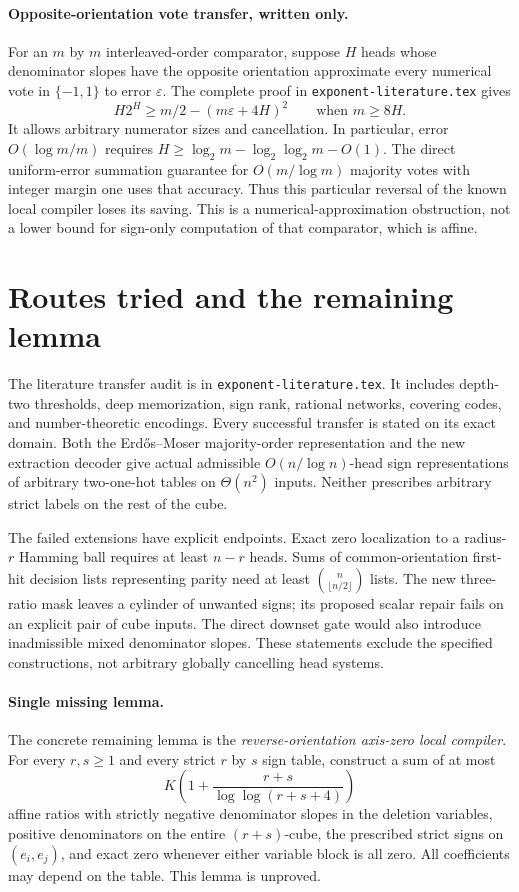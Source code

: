 \documentclass[11pt]{article}
\begin{document}
\paragraph{Opposite-orientation vote transfer, written only.}
For an $m$ by $m$ interleaved-order comparator, suppose $H$ heads
whose denominator slopes have the opposite orientation approximate
every numerical vote in $\{-1,1\}$ to error $\varepsilon$.
The complete proof in \texttt{exponent-literature.tex} gives
\[
 H2^H\geq m/2-(m\varepsilon+4H)^2
 \qquad\text{when }m\geq8H.
\]
It allows arbitrary numerator sizes and cancellation. In particular,
error $O(\log m/m)$ requires
$H\geq\log_2m-\log_2\log_2m-O(1)$.
The direct uniform-error summation guarantee for
$O(m/\log m)$ majority votes with integer margin one uses that
accuracy. Thus this
particular reversal of the known local compiler loses its saving.
This is a numerical-approximation obstruction, not a lower bound
for sign-only computation of that comparator, which is affine.

\section{Routes tried and the remaining lemma}

The literature transfer audit is in \texttt{exponent-literature.tex}.
It includes depth-two thresholds, deep memorization, sign rank,
rational networks, covering codes, and number-theoretic encodings.
Every successful transfer is stated on its exact domain. Both the
Erd\H{o}s--Moser majority-order representation and the new extraction
decoder give actual admissible $O(n/\log n)$-head sign representations
of arbitrary two-one-hot tables on $\Theta(n^2)$ inputs. Neither
prescribes arbitrary strict labels on the rest of the cube.

The failed extensions have explicit endpoints. Exact zero localization
to a radius-$r$ Hamming ball requires at least $n-r$ heads. Sums of
common-orientation first-hit decision lists representing parity need
at least $\binom n{\lfloor n/2\rfloor}$ lists. The new three-ratio
mask leaves a cylinder of unwanted signs; its proposed scalar repair
fails on an explicit pair of cube inputs. The direct downset gate
would also introduce inadmissible mixed denominator slopes. These
statements exclude the specified constructions, not arbitrary globally
cancelling head systems.

\paragraph{Single missing lemma.}
The concrete remaining lemma is the \emph{reverse-orientation
axis-zero local compiler}. For every $r,s\geq1$ and every strict
$r$ by $s$ sign table, construct a sum of at most
\[
 K\left(1+\frac{r+s}{\log\log(r+s+4)}\right)
\]
affine ratios with strictly negative denominator slopes in the deletion
variables, positive denominators on the entire $(r+s)$-cube,
the prescribed strict signs on $(e_i,e_j)$, and exact zero whenever
either variable block is all zero. All coefficients may depend on
the table. This lemma is unproved.
\end{document}
